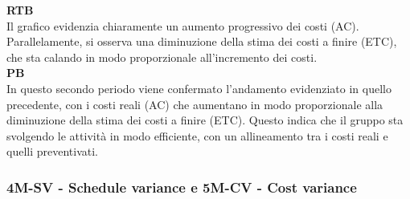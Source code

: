 \textbf{RTB} \\
Il grafico evidenzia chiaramente un aumento progressivo dei costi (AC). Parallelamente, si osserva una diminuzione della stima dei costi a finire (ETC), che sta calando in modo proporzionale all'incremento dei costi. \\

\textbf{PB} \\
In questo secondo periodo viene confermato l'andamento evidenziato in quello precedente, con i costi reali (AC) che aumentano in modo proporzionale alla diminuzione della stima dei costi a finire (ETC). Questo indica che il gruppo sta svolgendo le attività in modo efficiente, con un allineamento tra i costi reali e quelli preventivati.

\newpage
\subsubsection{4M-SV - Schedule variance e 5M-CV - Cost variance}
